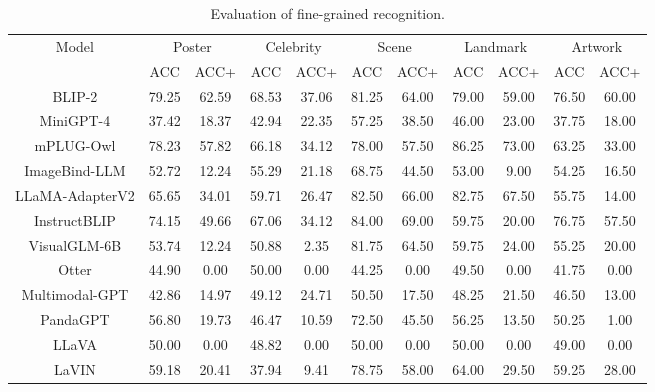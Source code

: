 \documentclass{article}
\begin{document}
\begin{table}[]
    \centering
    \begin{center}
        \begin{adjustbox}{max width=0.85\textwidth}
            \begin{tabular}{c|cc|cc|cc|cc|cc}
                \toprule
                \multirow{2}{*}{Model}&\multicolumn{2}{c|}{Poster}&\multicolumn{2}{c|}{Celebrity}&\multicolumn{2}{c|}{Scene}&\multicolumn{2}{c|}{Landmark}&\multicolumn{2}{c}{Artwork}\\
                &ACC&ACC+&ACC&ACC+&ACC&ACC+&ACC&ACC+&ACC&ACC+\\
                \midrule
                
                BLIP-2&79.25&62.59&68.53&37.06&81.25&64.00&79.00&59.00&76.50&60.00\\
                
                MiniGPT-4&37.42 &18.37 &42.94 &22.35 &57.25 &38.50 &46.00 &23.00 &37.75 &18.00 \\
                
                mPLUG-Owl&78.23 &57.82 &66.18&34.12&78.00&57.50&86.25&73.00&63.25&33.00\\

                ImageBind-LLM &52.72 &12.24 &55.29 &21.18 &68.75 &44.50 &53.00 &9.00 &54.25 &16.50 \\
                
                LLaMA-AdapterV2&65.65 &34.01 &59.71 &26.47 &82.50 &66.00 &82.75 &67.50 &55.75 &14.00 \\
                InstructBLIP&74.15&49.66&67.06&34.12&84.00&69.00&59.75&20.00&76.75&57.50\\
                
                VisualGLM-6B&53.74 &12.24&50.88&2.35&81.75&64.50&59.75&24.00&55.25 &20.00\\
                
                Otter&44.90&0.00 &50.00&0.00 &44.25&0.00  &49.50 &0.00 
                &41.75 &0.00 \\
                
                Multimodal-GPT&42.86 &14.97 &49.12&24.71 &50.50&17.50&48.25 &21.50 &46.50 &13.00 \\
                PandaGPT&56.80&19.73&46.47&10.59&72.50&45.50&56.25&13.50&50.25&1.00\\
                LLaVA&50.00&0.00&48.82&0.00&50.00&0.00&50.00&0.00&49.00&0.00\\

                LaVIN&59.18 &20.41 &37.94 &9.41 &78.75 &58.00 &64.00 &29.50 &59.25 &28.00 \\

                \bottomrule
            \end{tabular}%
        \end{adjustbox}
    \end{center}
    \caption{Evaluation of fine-grained recognition.}
    \label{table-2}
\end{table}
\end{document}
